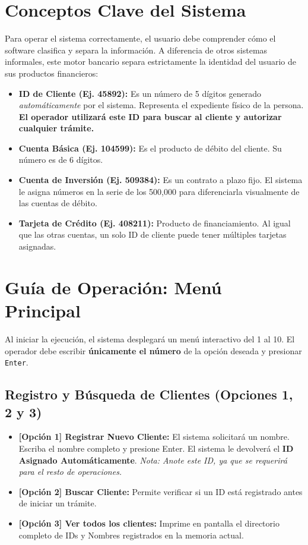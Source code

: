 \documentclass[12pt, letterpaper]{article}
\begin{document}
	\section{Conceptos Clave del Sistema}
	Para operar el sistema correctamente, el usuario debe comprender cómo el software clasifica y separa la información. A diferencia de otros sistemas informales, este motor bancario separa estrictamente la identidad del usuario de sus productos financieros:
	
	\begin{itemize}
		\item \textbf{ID de Cliente (Ej. 45892):} Es un número de 5 dígitos generado \textit{automáticamente} por el sistema. Representa el expediente físico de la persona. \textbf{El operador utilizará este ID para buscar al cliente y autorizar cualquier trámite.}
		\item \textbf{Cuenta Básica (Ej. 104599):} Es el producto de débito del cliente. Su número es de 6 dígitos.
		\item \textbf{Cuenta de Inversión (Ej. 509384):} Es un contrato a plazo fijo. El sistema le asigna números en la serie de los 500,000 para diferenciarla visualmente de las cuentas de débito.
		\item \textbf{Tarjeta de Crédito (Ej. 408211):} Producto de financiamiento. Al igual que las otras cuentas, un solo ID de cliente puede tener múltiples tarjetas asignadas.
	\end{itemize}
	
	\section{Guía de Operación: Menú Principal}
	Al iniciar la ejecución, el sistema desplegará un menú interactivo del 1 al 10. El operador debe escribir \textbf{únicamente el número} de la opción deseada y presionar \texttt{Enter}.
	
	\subsection{Registro y Búsqueda de Clientes (Opciones 1, 2 y 3)}
	\begin{itemize}
		\item \textbf{[Opción 1] Registrar Nuevo Cliente:} El sistema solicitará un nombre. Escriba el nombre completo y presione Enter. El sistema le devolverá el \textbf{ID Asignado Automáticamente}. \textit{Nota: Anote este ID, ya que se requerirá para el resto de operaciones.}
		\item \textbf{[Opción 2] Buscar Cliente:} Permite verificar si un ID está registrado antes de iniciar un trámite.
		\item \textbf{[Opción 3] Ver todos los clientes:} Imprime en pantalla el directorio completo de IDs y Nombres registrados en la memoria actual.
	\end{itemize}
	
\end{document}

